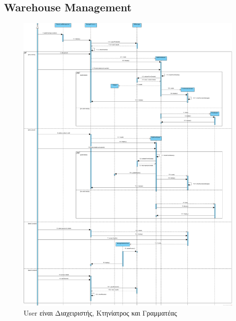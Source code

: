 \documentclass[12pt,a4paper,twoside]{book}
\begin{document}
\subsection{Warehouse Management}
\begin{figure}[H]
    \centering
    \includegraphics[width=\textwidth]{Resources/Sequence Diagram/warehouse_management_sd.png}
    \caption{User είναι Διαχειριστής, Κτηνίατρος και Γραμματέας}\label{fig:sequence-warehouse-management}
\end{figure}
\end{document}
